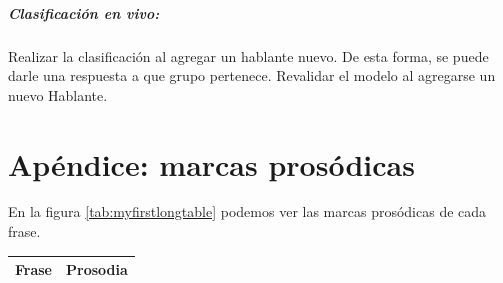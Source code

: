 \documentclass[11pt,a4paper,twoside]{tesis}
\begin{document}
\paragraph*{Clasificación en vivo:} Realizar la clasificación al agregar un hablante nuevo. De esta forma, se puede darle una respuesta a que grupo pertenece. Revalidar el modelo al agregarse un nuevo Hablante. 

\chapter{Apéndice: marcas prosódicas}

En la figura \ref{tab:myfirstlongtable} podemos ver las marcas prosódicas de cada frase.

\centering
\begin{longtable}{| p{} | p{} |} 
\hline
\textbf{Frase}  & \textbf{Prosodia}  \\ \hline


\end{longtable}
\end{document}
